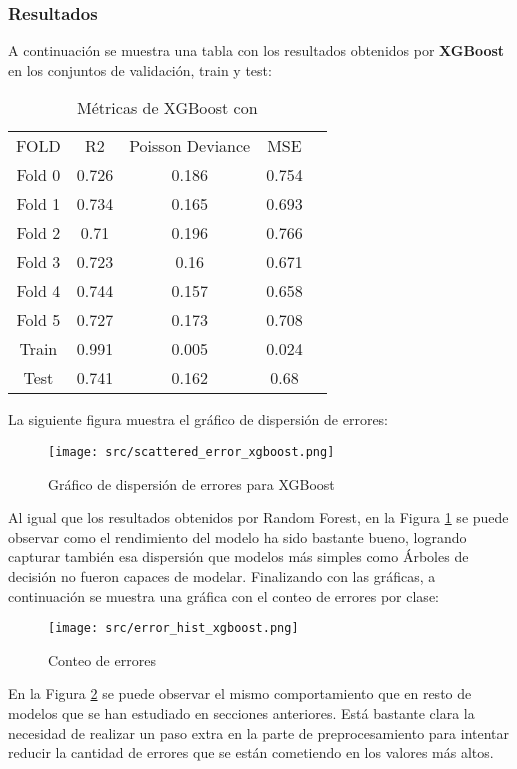 \subsubsection*{Resultados}
A continuación se muestra una tabla con los resultados obtenidos por \textbf{XGBoost} en los conjuntos de validación, train y test:
\begin{table}[H]
	\centering
	\begin{tabular}{|c|c|c|c|c|}
		\cline{1-4}
		FOLD   & R2    & Poisson Deviance & MSE   \\ \cline{1-4}
		Fold 0 & 0.726 & 0.186            & 0.754 \\ \cline{1-4}
		Fold 1 & 0.734 & 0.165            & 0.693 \\ \cline{1-4}
		Fold 2 & 0.71  & 0.196            & 0.766 \\ \cline{1-4}
		Fold 3 & 0.723 & 0.16             & 0.671 \\ \cline{1-4}
		Fold 4 & 0.744 & 0.157            & 0.658 \\ \cline{1-4}
		Fold 5 & 0.727 & 0.173            & 0.708 \\ \cline{1-4}
		Train  & 0.991 & 0.005            & 0.024 \\ \cline{1-4}
		Test   & 0.741 & 0.162            & 0.68  \\ \cline{1-4}
	\end{tabular}
	\caption{Métricas de XGBoost con}
	\label{tab:xgboost}
\end{table}
\clearpage
La siguiente figura muestra el gráfico de dispersión de errores:
\begin{figure}[H]
	\centering
	\texttt{[image: src/scattered\_error\_xgboost.png]}
	\caption{Gráfico de dispersión de errores para XGBoost}
	\label{fig:xgboost_scattered}
\end{figure}
Al igual que los resultados obtenidos por Random Forest, en la Figura \ref{fig:xgboost_scattered} se puede observar como el rendimiento del modelo ha sido bastante bueno, logrando capturar también esa dispersión que modelos más simples como Árboles de decisión no fueron capaces de modelar.
\clearpage
Finalizando con las gráficas, a continuación se muestra una gráfica con el conteo de errores por clase:
\begin{figure}[H]
	\centering
	\texttt{[image: src/error\_hist\_xgboost.png]}
	\caption{Conteo de errores}
	\label{fig:xgboost_error_plot}
\end{figure}
En la Figura \ref{fig:xgboost_error_plot} se puede observar el mismo comportamiento que en resto de modelos que se han estudiado en secciones anteriores. Está bastante clara la necesidad de realizar un paso extra en la parte de preprocesamiento para intentar reducir la cantidad de errores que se están cometiendo en los valores más altos.
\clearpage
